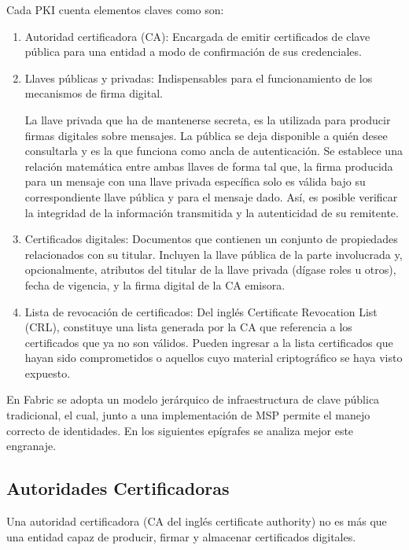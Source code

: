 Cada PKI cuenta elementos claves como son:
\begin{enumerate}
	\item Autoridad certificadora (CA): Encargada de emitir certificados de clave p\'ublica para una entidad a modo de confirmaci\'on de sus credenciales.
	
	\item Llaves p\'ublicas y privadas: Indispensables para el funcionamiento de los mecanismos de firma digital.
	
	La llave privada que ha de mantenerse secreta, es la utilizada para producir firmas digitales sobre mensajes. La p\'ublica se deja disponible a qui\'en desee consultarla y es la que funciona como ancla de autenticaci\'on. Se establece una relaci\'on matem\'atica entre ambas llaves de forma tal que, la firma producida para un mensaje con una llave privada espec\'ifica solo es v\'alida bajo su correspondiente llave p\'ublica y para el mensaje dado. As\'i, es posible verificar la integridad de la informaci\'on transmitida y la autenticidad de su remitente.
	
	\item Certificados digitales: Documentos que contienen un conjunto de propiedades relacionados con su titular. Incluyen la llave p\'ublica de la parte involucrada y, opcionalmente, atributos del titular de la llave privada (d\'igase roles u otros), fecha de vigencia, y la firma digital de la CA emisora.
	
	\item Lista de revocaci\'on de certificados: Del ingl\'es Certificate Revocation List (CRL), constituye una lista generada por la CA que referencia a los certificados que ya no son v\'alidos. Pueden ingresar a la lista certificados que hayan sido comprometidos o aquellos cuyo material criptogr\'afico se haya visto expuesto.
	
\end{enumerate}

En Fabric se adopta un modelo jer\'arquico de infraestructura de clave pública tradicional, el cual, junto a una implementaci\'on de MSP permite el manejo correcto de identidades. En los siguientes ep\'igrafes se analiza mejor este engranaje.

\subsection{Autoridades Certificadoras}
Una autoridad certificadora (CA del ingl\'es certificate authority) no es m\'as que una entidad capaz de producir, firmar y almacenar certificados digitales.

